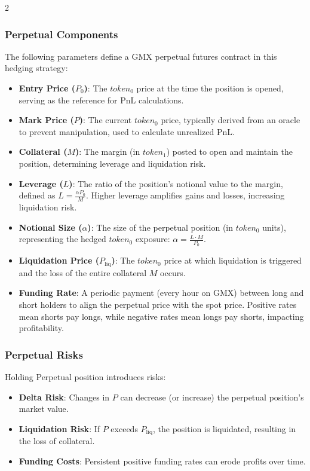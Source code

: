 \documentclass[10pt]{article}
\begin{document}
\begin{multicols}{2}
\subsubsection{Perpetual Components}
The following parameters define a GMX perpetual futures contract in this hedging strategy:
\begin{itemize}
	\item \textbf{Entry Price ($P_0$)}: The $token_0$ price at the time the position is opened, serving as the reference for PnL calculations.
	\item \textbf{Mark Price ($P$)}: The current $token_0$ price, typically derived from an oracle to prevent manipulation, used to calculate unrealized PnL.
	\item \textbf{Collateral ($M$)}: The margin (in $token_1$) posted to open and maintain the position, determining leverage and liquidation risk.
	\item \textbf{Leverage ($L$)}: The ratio of the position’s notional value to the margin, defined as $L = \frac{\alpha P_0}{M}$. Higher leverage amplifies gains and losses, increasing liquidation risk.
	\item \textbf{Notional Size ($\alpha$)}: The size of the perpetual position (in $token_0$ units), representing the hedged $token_0$ exposure: $\alpha = \frac{L \cdot M}{P_0}$.
	\item \textbf{Liquidation Price ($P_{\mathrm{liq}}$)}: The $token_0$ price at which liquidation is triggered and the loss of the entire collateral $M$ occurs. 
	\item \textbf{Funding Rate}: A periodic payment (every hour on GMX) between long and short holders to align the perpetual price with the spot price. Positive rates mean shorts pay longs, while negative rates mean longs pay shorts, impacting profitability.
\end{itemize}

\subsubsection{Perpetual Risks}
Holding Perpetual position introduces risks:
\begin{itemize}
    \item \textbf{Delta Risk}: Changes in $P$ can decrease (or increase) the perpetual position’s market value.
	\item \textbf{Liquidation Risk}: If $P$ exceeds $P_{\mathrm{liq}}$, the position is liquidated, resulting in the loss of collateral.
	\item \textbf{Funding Costs}: Persistent positive funding rates can erode profits over time.
\end{itemize}


\end{multicols}
\end{document}
